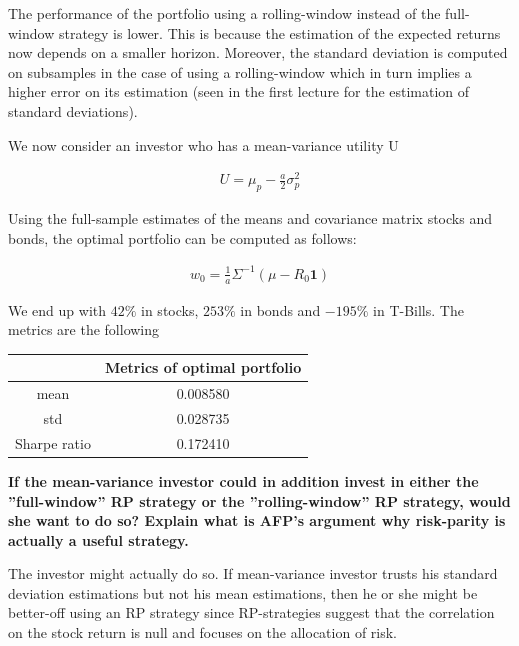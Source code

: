 \documentclass[10pt]{article}
\newenvironment{exercise}[2][Exercise]{\begin{trivlist}
  \item[\hskip \labelsep {\bfseries #1}\hskip \labelsep {\bfseries #2.}]}{\end{trivlist}}
\begin{document}
\begin{exercise}{3}
	\smallbreak
	
	The performance of the portfolio using a rolling-window instead of the full-window strategy is lower. This is because the estimation of  the expected returns now depends on a smaller horizon. Moreover, the standard deviation is computed on subsamples in the case of using a rolling-window which in turn implies a higher error on its estimation (seen in the first lecture for the estimation of standard deviations).
	
	\bigbreak
	
	We now consider an investor who has a mean-variance utility U
	
	\begin{align*}
		U = \mu_{p} - \frac{a}{2}\sigma^{2}_{p}
	\end{align*}
	
	Using the full-sample estimates of the means and covariance matrix stocks and bonds, the optimal portfolio can be computed as follows:
	
	\begin{align*}
		w_{0} = \frac{1}{a} \Sigma^{-1} (\mu  - R_{0}\textbf{1})
	\end{align*}
	
	We end up with $42\%$ in stocks, $253\%$ in bonds and $-195\%$ in T-Bills. The metrics are the following
	
	\begin{table}[h!]
		\centering
 		\begin{tabular}{||c c||} 
 			\hline
 			& Metrics of optimal portfolio \\ [0.5ex] 
 			\hline\hline
 			mean & 0.008580 \\ 
 			std & 0.028735 \\
 			Sharpe ratio & 0.172410 \\ [1ex] 
 			\hline
		 \end{tabular}
	\end{table}	
	
	\textbf{If the mean-variance investor could in addition invest in either the ”full-window” RP strategy or the ”rolling-window” RP strategy, would she want to do so? Explain what is AFP’s argument why risk-parity is actually a useful strategy.}
	
	\smallbreak
	
	The investor might actually do so. If mean-variance investor trusts his standard deviation estimations but not his mean estimations, then he or she might be better-off using an RP strategy since RP-strategies suggest that the correlation on the stock return is null and focuses on the allocation of risk.
	

\end{exercise}
  
\end{document}
